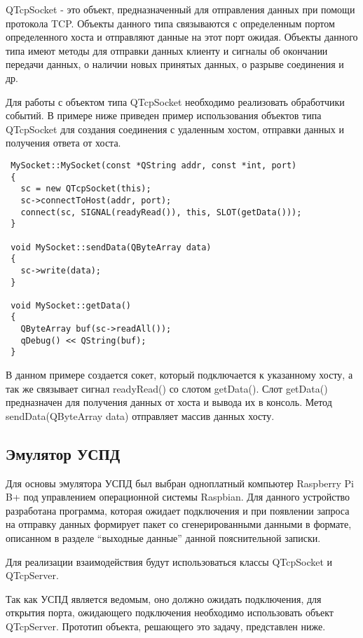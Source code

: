 QTcpSocket - это объект, предназначенный для отправления данных при помощи протокола TCP. Объекты данного типа связываются с определенным портом определенного хоста и отправляют данные на этот порт ожидая. Объекты данного типа имеют методы для отправки данных клиенту и сигналы об окончании передачи данных, о наличии новых принятых данных, о разрыве соединения и др.

Для работы с объектом типа QTcpSocket необходимо реализовать обработчики событий. В примере ниже приведен пример использования объектов типа QTcpSocket для создания соединения с удаленным хостом, отправки данных и получения ответа от хоста.

\begin{lstlisting}
 MySocket::MySocket(const *QString addr, const *int, port)
 {
   sc = new QTcpSocket(this);
   sc->connectToHost(addr, port);
   connect(sc, SIGNAL(readyRead()), this, SLOT(getData()));
 }
 
 void MySocket::sendData(QByteArray data)
 {
   sc->write(data);
 }
 
 void MySocket::getData()
 {
   QByteArray buf(sc->readAll());
   qDebug() << QString(buf);
 }
\end{lstlisting}

В данном примере создается сокет, который подключается к указанному хосту, а так же связывает сигнал readyRead() со слотом getData(). Слот getData() предназначен для получения данных от хоста и вывода их в консоль. Метод sendData(QByteArray data) отправляет массив данных хосту.

\subsection{Эмулятор УСПД}

Для основы эмулятора УСПД был выбран одноплатный компьютер Raspberry Pi B+ под управлением операционной системы Raspbian. Для данного устройство разработана программа, которая ожидает подключения и при появлении запроса на отправку данных формирует пакет со сгенерированными данными в формате, описанном в разделе ``выходные данные'' данной пояснительной записки.

Для реализации взаимодействия будут использоваться классы QTcpSocket и QTcpServer.

Так как УСПД является ведомым, оно должно ожидать подключения, для открытия порта, ожидающего подключения необходимо использовать объект QTcpServer. Прототип объекта, решающего это задачу, представлен ниже.


